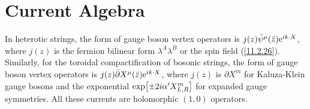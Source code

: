 \section{Current Algebra} \label{sec:11.5}

In heterotic strings, the form of gauge boson vertex operators is $j(z)\tilde{\psi}^{\mu}(\bar{z})\mathrm{e}^{i k\cdot X}$, where $j(z)$ is the fermion bilinear form $\lambda^{A}\lambda^{B}$ or the spin field (\ref{11.2.26}). Similarly, for the toroidal compactification of bosonic strings, the form of gauge boson vertex operators is $j(z)\bar{\partial}X^{\mu}(\bar{z})\mathrm{e}^{i k\cdot X}$, where $j(z)$ is $\partial X^{m}$ for Kaluza-Klein gauge bosons and the exponential $\exp[\pm 2i\alpha^{\prime}X^{m}_{L,R}]$ for expanded gauge symmetries. All these currents are holomorphic $(1,0)$ operators.

